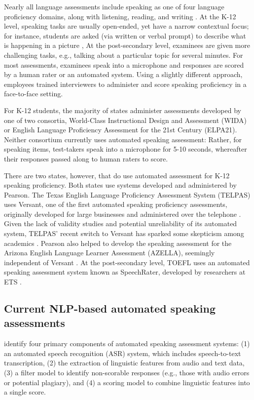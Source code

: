 \documentclass [PhD] {uclathes}
\begin{document}
Nearly all language assessments include speaking as one of four language proficiency domains, along with listening, reading, and writing \citep{ccsso2012framework}. At the K-12 level, speaking tasks are usually open-ended, yet have a narrow contextual focus; for instance, students are asked (via written or verbal prompt) to describe what is happening in a picture \citep{luoma2004assessing}, At the post-secondary level, examinees are given more challenging tasks, e.g., talking about a particular topic for several minutes. For most assessments, examinees speak into a microphone and responses are scored by a human rater or an automated system. Using a slightly different approach, \citet{ielts2023} employees trained interviewers to administer and score speaking proficiency in a face-to-face setting.

For K-12 students, the majority of states administer assessments developed by one of two consortia, World-Class Instructional Design and Assessment (WIDA) or English Language Proficiency Assessment for the 21st Century (ELPA21). Neither consortium currently uses automated speaking assessment: Rather, for speaking items, test-takers speak into a microphone for 5-10 seconds, whereafter their responses passed along to human raters to score.

There are two states, however, that do use automated assessment for K-12 speaking proficiency. Both states use systems developed and administered by Pearson. The Texas English Language Proficiency Assessment System (TELPAS) uses Versant, one of the first automated speaking proficiency assessments, originally developed for large businesses and administered over the telephone \citep{pearson2019versant}. Given the lack of validity studies and potential unreliability of its automated system, TELPAS’ recent switch to Versant has sparked some skepticism among academics \citep{collier2020test}. Pearson also helped to develop the speaking assessment for the Arizona English Language Learner Assessment (AZELLA), seemingly independent of Versant \citep{johnston2019using}. At the post-secondary level, TOEFL uses an automated speaking assessment system known as SpeechRater, developed by researchers at ETS \citep{chen2018automated}.

\subsection{Current NLP-based automated speaking assessments}

\citet{chen2018automated} identify four primary components of automated speaking assessment systems: (1) an automated speech recognition (ASR) system, which includes speech-to-text transcription, (2) the extraction of linguistic features from audio and text data, (3) a filter model to identify non-scorable responses (e.g., those with audio errors or potential plagiary), and (4) a scoring model to combine linguistic features into a single score.
\end{document}
